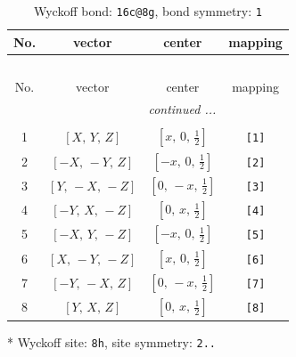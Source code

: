 \documentclass[fleqn,8pt]{jsarticle}
\begin{document}
\renewcommand{\arraystretch}{1.2}
\begin{longtable}{cccc}
\caption{Wyckoff bond: {\tt 16c@8g}, bond symmetry: {\tt 1}}
 \\
 \hline \hline
No. & vector & center & mapping \\ \hline \endfirsthead

\multicolumn{3}{l}{\tablename\ \thetable{}} \\
 \hline \hline
No. & vector & center & mapping \\ \hline \endhead

 \hline \hline
\multicolumn{3}{r}{\footnotesize\it continued ...} \\ \endfoot

 \hline \hline
\multicolumn{3}{r}{} \\ \endlastfoot

1 & $\left[ X,\, Y,\, Z \right]$ & $\left[ x,\, 0,\, \frac{1}{2} \right]$ & {\tt [1]} \\ \hline
2 & $\left[ - X,\, - Y,\, Z \right]$ & $\left[ - x,\, 0,\, \frac{1}{2} \right]$ & {\tt [2]} \\ \hline
3 & $\left[ Y,\, - X,\, - Z \right]$ & $\left[ 0,\, - x,\, \frac{1}{2} \right]$ & {\tt [3]} \\ \hline
4 & $\left[ - Y,\, X,\, - Z \right]$ & $\left[ 0,\, x,\, \frac{1}{2} \right]$ & {\tt [4]} \\ \hline
5 & $\left[ - X,\, Y,\, - Z \right]$ & $\left[ - x,\, 0,\, \frac{1}{2} \right]$ & {\tt [5]} \\ \hline
6 & $\left[ X,\, - Y,\, - Z \right]$ & $\left[ x,\, 0,\, \frac{1}{2} \right]$ & {\tt [6]} \\ \hline
7 & $\left[ - Y,\, - X,\, Z \right]$ & $\left[ 0,\, - x,\, \frac{1}{2} \right]$ & {\tt [7]} \\ \hline
8 & $\left[ Y,\, X,\, Z \right]$ & $\left[ 0,\, x,\, \frac{1}{2} \right]$ & {\tt [8]} \\
\end{longtable}
* Wyckoff site: {\tt 8h}, site symmetry: {\tt 2..}
\renewcommand{\arraystretch}{1.2}
\end{document}

